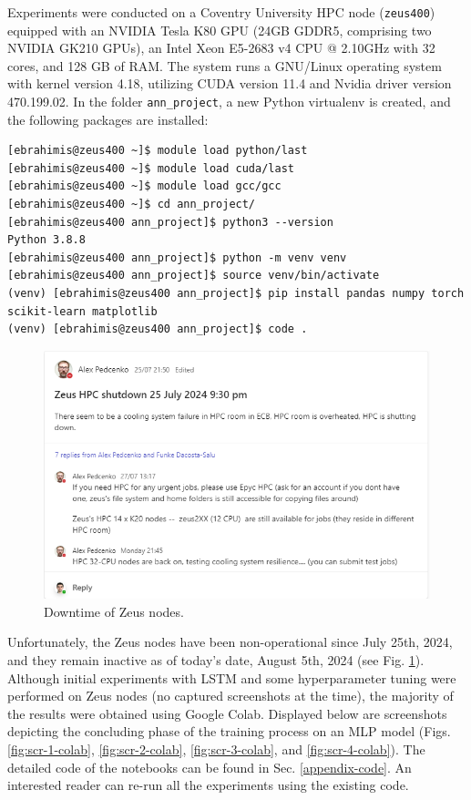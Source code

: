 \documentclass[journal,onecolumn]{IEEEtran}
\begin{document}
{\begin{appendices}
Experiments were conducted on a Coventry University HPC node (\texttt{zeus400}) equipped with an NVIDIA Tesla K80 GPU (24GB GDDR5, comprising two NVIDIA GK210 GPUs), an Intel Xeon E5-2683 v4 CPU @ 2.10GHz with 32 cores, and 128 GB of RAM. The system runs a GNU/Linux operating system with kernel version 4.18, utilizing CUDA version 11.4 and Nvidia driver version 470.199.02. In the folder \texttt{ann\_project}, a new Python virtualenv is created, and the following packages are installed:

\begin{verbatim}
[ebrahimis@zeus400 ~]$ module load python/last
[ebrahimis@zeus400 ~]$ module load cuda/last
[ebrahimis@zeus400 ~]$ module load gcc/gcc
[ebrahimis@zeus400 ~]$ cd ann_project/
[ebrahimis@zeus400 ann_project]$ python3 --version
Python 3.8.8
[ebrahimis@zeus400 ann_project]$ python -m venv venv
[ebrahimis@zeus400 ann_project]$ source venv/bin/activate
(venv) [ebrahimis@zeus400 ann_project]$ pip install pandas numpy torch scikit-learn matplotlib
(venv) [ebrahimis@zeus400 ann_project]$ code .
\end{verbatim}

\begin{figure}
    \centering
    \includegraphics[width=0.59\linewidth]{figures/scr-0-zeus.png}
    \caption{Downtime of Zeus nodes.}
    \label{fig:scr-0-zeus}
\end{figure}

Unfortunately, the Zeus nodes have been non-operational since July 25th, 2024, and they remain inactive as of today's date, August 5th, 2024 (see Fig. \ref{fig:scr-0-zeus}). Although initial experiments with LSTM and some hyperparameter tuning were performed on Zeus nodes (no captured screenshots at the time), the majority of the results were obtained using Google Colab. Displayed below are screenshots depicting the concluding phase of the training process on an MLP model (Figs. \ref{fig:scr-1-colab}, \ref{fig:scr-2-colab}, \ref{fig:scr-3-colab}, and \ref{fig:scr-4-colab}). The detailed code of the notebooks can be found in Sec. \ref{appendix-code}. An interested reader can re-run all the experiments using the existing code.


\end{appendices}}
\end{document}
